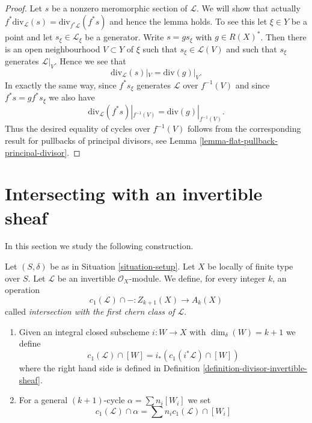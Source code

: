\begin{proof}
Let $s$ be a nonzero meromorphic section of $\mathcal{L}$.
We will show that actually
$f^*\text{div}_\mathcal{L}(s) = \text{div}_{f^*\mathcal{L}}(f^*s)$
and hence the lemma holds.
To see this let $\xi \in Y$ be a point and let $s_\xi \in \mathcal{L}_\xi$
be a generator. Write $s = gs_\xi$ with $g \in R(X)^*$.
Then there is an open neighbourhood $V \subset Y$ of $\xi$
such that $s_\xi \in \mathcal{L}(V)$ and such that $s_\xi$ generates
$\mathcal{L}|_V$. Hence we see that
$$
\text{div}_\mathcal{L}(s)|_V = \text{div}(g)|_V.
$$
In exactly the same way, since $f^*s_\xi$ generates $\mathcal{L}$
over $f^{-1}(V)$ and since $f^*s = g f^*s_\xi$ we also
have
$$
\text{div}_\mathcal{L}(f^*s)|_{f^{-1}(V)}
=
\text{div}(g)|_{f^{-1}(V)}.
$$
Thus the desired equality of cycles over $f^{-1}(V)$ follows from the
corresponding result for pullbacks of principal divisors, see
Lemma \ref{lemma-flat-pullback-principal-divisor}.
\end{proof}



\section{Intersecting with an invertible sheaf}
\label{section-intersecting-with-divisors}

\noindent
In this section we study the following construction.

\begin{definition}
\label{definition-cap-c1}
Let $(S, \delta)$ be as in Situation \ref{situation-setup}.
Let $X$ be locally of finite type over $S$.
Let $\mathcal{L}$ be an invertible $\mathcal{O}_X$-module.
We define, for every integer $k$, an operation
$$
c_1(\mathcal{L}) \cap - :
Z_{k + 1}(X) \to A_k(X)
$$
called {\it intersection with the first chern class of $\mathcal{L}$}.
\begin{enumerate}
\item Given an integral closed subscheme $i : W \to X$ with
$\dim_\delta(W) = k + 1$ we define
$$
c_1(\mathcal{L}) \cap [W] = i_*(c_1({i^*\mathcal{L}}) \cap [W])
$$
where the right hand side is defined in
Definition \ref{definition-divisor-invertible-sheaf}.
\item For a general $(k + 1)$-cycle $\alpha = \sum n_i [W_i]$ we set
$$
c_1(\mathcal{L}) \cap \alpha = \sum n_i c_1(\mathcal{L}) \cap [W_i]
$$
\end{enumerate}
\end{definition}

